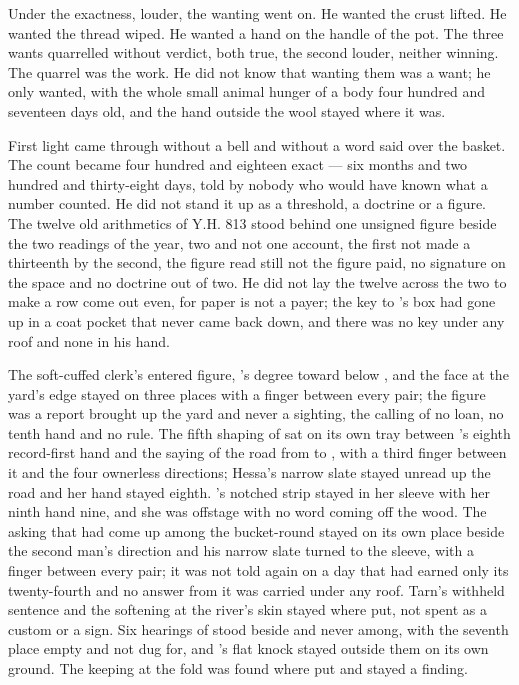 Under the exactness, louder, the wanting went on. He wanted the crust lifted. He wanted the thread wiped. He wanted a hand on the handle of the pot. The three wants quarrelled without verdict, both true, the second louder, neither winning. The quarrel was the work. He did not know that wanting them was a want; he only wanted, with the whole small animal hunger of a body four hundred and seventeen days old, and the hand outside the wool stayed where it was.

First light came through  without a bell and without a word said over the basket. The count became four hundred and eighteen exact --- six months and two hundred and thirty-eight days, told by nobody who would have known what a number counted. He did not stand it up as a threshold, a doctrine or a figure. The twelve old arithmetics of Y.H. 813 stood behind one unsigned figure beside the two readings of the year, two and not one account, the first not made a thirteenth by the second, the figure read still not the figure paid, no signature on the space and no doctrine out of two. He did not lay the twelve across the two to make a row come out even, for paper is not a payer; the key to 's box had gone up  in a coat pocket that never came back down, and there was no key under any roof and none in his hand.

The soft-cuffed clerk's entered figure, 's degree toward  below , and the face at the yard's edge stayed on three places with a finger between every pair; the figure was a report brought up the yard and never a sighting, the calling of no loan, no tenth hand and no rule. The fifth shaping of  sat on its own tray between 's eighth record-first hand and the saying of the road from  to , with a third finger between it and the four ownerless directions; Hessa's narrow slate stayed unread up the road and her hand stayed eighth. 's notched strip stayed in her sleeve with her ninth hand nine, and she was offstage with no word coming off the wood. The asking that had come up among the bucket-round stayed on its own place beside the second man's direction and his narrow slate turned to the sleeve, with a finger between every pair; it was not told again on a day that had earned only its twenty-fourth and no answer from it was carried under any roof. Tarn's withheld sentence and the softening at the river's skin stayed where put, not spent as a custom or a sign. Six hearings of  stood beside and never among, with the seventh place empty and not dug for, and 's flat knock stayed outside them on its own ground. The keeping at the fold was found where put and stayed a finding.


